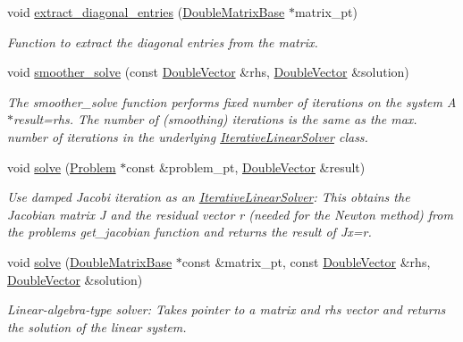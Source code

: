 \begin{DoxyCompactItemize}
void \hyperlink{classoomph_1_1DampedJacobi_a5aa970c787a03bcd3127389617c64629}{extract\+\_\+diagonal\+\_\+entries} (\hyperlink{classoomph_1_1DoubleMatrixBase}{Double\+Matrix\+Base} $\ast$matrix\+\_\+pt)
\begin{DoxyCompactList}\small\item\em Function to extract the diagonal entries from the matrix. \end{DoxyCompactList}\item 
void \hyperlink{classoomph_1_1DampedJacobi_af1e5baec4c87874bbd2a2834810f92ba}{smoother\+\_\+solve} (const \hyperlink{classoomph_1_1DoubleVector}{Double\+Vector} \&rhs, \hyperlink{classoomph_1_1DoubleVector}{Double\+Vector} \&solution)
\begin{DoxyCompactList}\small\item\em The smoother\+\_\+solve function performs fixed number of iterations on the system A$\ast$result=rhs. The number of (smoothing) iterations is the same as the max. number of iterations in the underlying \hyperlink{classoomph_1_1IterativeLinearSolver}{Iterative\+Linear\+Solver} class. \end{DoxyCompactList}\item 
void \hyperlink{classoomph_1_1DampedJacobi_ace422835d94b7d465d08cc1f4df192ea}{solve} (\hyperlink{classoomph_1_1Problem}{Problem} $\ast$const \&problem\+\_\+pt, \hyperlink{classoomph_1_1DoubleVector}{Double\+Vector} \&result)
\begin{DoxyCompactList}\small\item\em Use damped Jacobi iteration as an \hyperlink{classoomph_1_1IterativeLinearSolver}{Iterative\+Linear\+Solver}\+: This obtains the Jacobian matrix J and the residual vector r (needed for the Newton method) from the problem\textquotesingle{}s get\+\_\+jacobian function and returns the result of Jx=r. \end{DoxyCompactList}\item 
void \hyperlink{classoomph_1_1DampedJacobi_afe13701a3101a01ae59334d688004a99}{solve} (\hyperlink{classoomph_1_1DoubleMatrixBase}{Double\+Matrix\+Base} $\ast$const \&matrix\+\_\+pt, const \hyperlink{classoomph_1_1DoubleVector}{Double\+Vector} \&rhs, \hyperlink{classoomph_1_1DoubleVector}{Double\+Vector} \&solution)
\begin{DoxyCompactList}\small\item\em Linear-\/algebra-\/type solver\+: Takes pointer to a matrix and rhs vector and returns the solution of the linear system. \end{DoxyCompactList}\item 

\end{DoxyCompactItemize}
